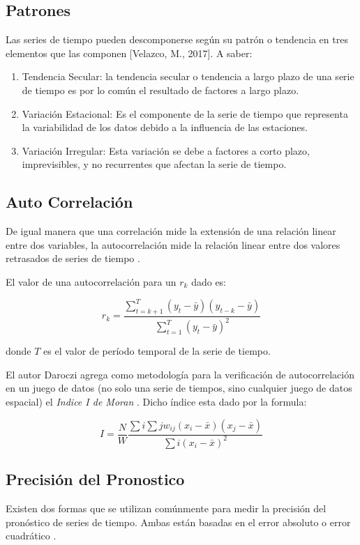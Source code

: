\documentclass[letterpaper, spanish, 11pt]{report}
\begin{document}
\subsection{Patrones}
Las series de tiempo pueden descomponerse según su patrón o tendencia en tres elementos que las componen [Velazco, M., 2017]. A saber:

\begin{enumerate}
	\item Tendencia Secular: la tendencia secular o tendencia a largo plazo de una serie de tiempo es por lo común el resultado de factores a largo plazo.
	\item Variación Estacional: Es el componente de la serie de tiempo que representa la variabilidad de los datos debido a la influencia de las estaciones.
	\item Variación Irregular: Esta variación se debe a factores a corto plazo, imprevisibles, y no recurrentes que afectan la serie de tiempo.
\end{enumerate}

\subsection{Auto Correlación}
De igual manera que una correlación mide la extensión de una relación linear entre dos variables, la autocorrelación mide la relación linear entre dos valores retrasados de series de tiempo \cite{hyndman}.

El valor de una autocorrelación para un \(r_{k}\) dado es:

\[ r_{k} = \frac{\sum_{t = k + 1}^T(y_{t} - \bar{y})(y_{t - k} - \bar{y})}{\sum_{t = 1}^T(y_{t} - \bar{y})^{2}} \]

donde \(T\) es el valor de período temporal de la serie de tiempo.

El autor Daroczi agrega como metodología para la verificación de autocorrelación en un juego de datos (no solo una serie de tiempos, sino cualquier juego de datos espacial) el \emph{Indice I de Moran} \cite{daroczi}. Dicho índice esta dado por la formula:

\[ I = \frac{N}{W}
	\frac{\sum{i}\sum{j}w_{ij}(x_{i} - \bar{x})(x_{j} - \bar{x})}{{\sum{i}(x_{i} - \bar{x})^2}} \]

\subsection{Precisión del Pronostico}
Existen dos formas que se utilizan comúnmente para medir la precisión del pronóstico de series de tiempo. Ambas están basadas en el error absoluto o error cuadrático \cite{hyndman}.
\end{document}
